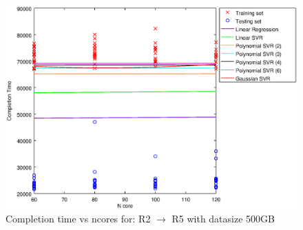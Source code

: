 
\begin {figure}[hbtp]
\centering
\includegraphics[width=\textwidth]{output/R2_R5_500_ALL_FEATURES/plot_R2_R5_500.eps}
\caption{Completion time vs ncores for: R2 $\rightarrow$ R5 with datasize 500GB}
\label{fig:coreonly_linear_R2_R5_500}
\end {figure}
